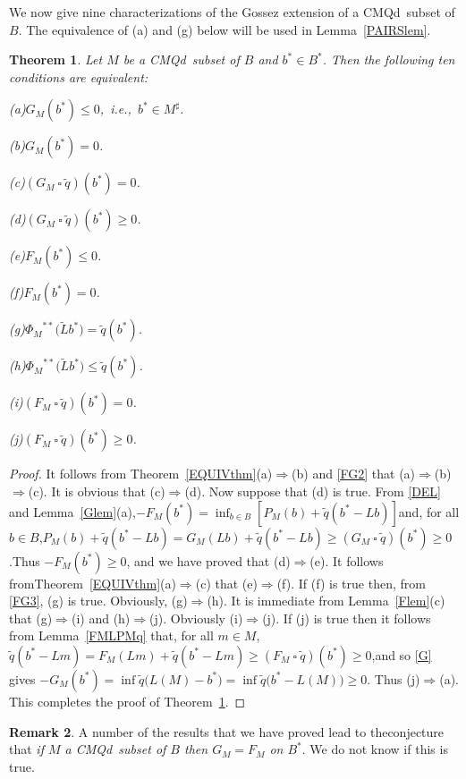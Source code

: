 \documentclass[letterpaper]{article}
\theoremstyle{plain}
\newtheorem{theorem}{Theorem}[section]
\theoremstyle{definition}
\newtheorem{remark}[theorem]{Remark}
\numberwithin{equation}{section}
\newcommand{\cmqd}{{CMQd}}
\newcommand{\dbs}{^{**}}
\newcommand{\infn}{\inf\nolimits}
\newcommand{\lr}{\Longrightarrow}
\newcommand{\Lt}{{\wt L}}
\newcommand{\qt}{\wt q}
\newcommand{\ssquare}{\ \square\ }
\newcommand{\wt}{\widetilde}
\newcommand{\Lem}{Lemma~\ref}
\newcommand{\Sec}{Section~\ref}
\newcommand{\Thm}{Theorem~\ref}
\begin{document}
%
We now give nine characterizations of the Gossez extension of a \cmqd\ subset of $B$.   The equivalence of (a) and (g) below will be used in \Lem{PAIRSlem}. 
\begin{theorem}\label{EQthm}
Let $M$ be a \cmqd\ subset of $B$ and $b^* \in B^*$.   Then the following ten conditions are equivalent:\par\noindent
{\rm(a)}\enspace $G_M(b^*) \le 0$,\hbox{\rm\ i.e.,  $b^* \in M^\sharp$.}\par\noindent
{\rm(b)}\enspace $G_M(b^*) = 0$.\par\noindent
{\rm(c)}\enspace $(G_M \ssquare\qt)(b^*) = 0$.\par\noindent
{\rm(d)}\enspace $(G_M \ssquare \qt)(b^*) \ge 0$.\par\noindent
{\rm(e)}\enspace $F_M(b^*) \le 0$.\par\noindent
{\rm(f)}\enspace $F_M(b^*) = 0$.\par\noindent
{\rm(g)}\enspace ${\Phi_M}\dbs\big(\Lt b^*\big) = \qt(b^*)$.\par\noindent
{\rm(h)}\enspace ${\Phi_M}\dbs\big(\Lt b^*\big) \le \qt(b^*)$.\par\noindent
{\rm(i)}\enspace $(F_M \ssquare \qt)(b^*) = 0$.\par\noindent
{\rm(j)}\enspace $(F_M \ssquare \qt)(b^*) \ge 0$.
\end{theorem}
%
\begin{proof}
It follows from \Thm{EQUIVthm}(a)$\lr$(b) and \eqref{FG2} that (a)$\lr$(b)$\lr$(c).    It is obvious that (c)$\lr$(d).  Now suppose that (d) is true.   From \eqref{DEL} and \Lem{Glem}(a),\quad $-F_M(b^*) = \infn_{b \in B}[P_M(b) + \qt(b^* - Lb)]$\quad and, for all $b \in B$,\quad $P_M(b) + \qt(b^* - Lb) = G_M(Lb) + \qt(b^* - Lb) \ge (G_M \ssquare \qt)(b^*) \ge 0$.\break Thus $-F_M(b^*) \ge 0$, and we have proved that (d)$\lr$(e).    It follows from\break \Thm{EQUIVthm}(a)$\lr$(c) that (e)$\lr$(f).   If (f) is true then, from \eqref{FG3}, (g) is true.   Obviously, (g)$\lr$(h).  It is immediate from \Lem{Flem}(c) that (g)$\lr$(i) and (h)$\lr$(j). Obviously (i)$\lr$(j).   If (j) is true then it follows from \Lem{FMLPMq} that, for all $m \in M$,\quad $\qt(b^* - Lm) = F_M(Lm) + \qt(b^* - Lm) \ge (F_M \ssquare \qt)(b^*) \ge 0$,\quad and so  \eqref{G} gives\quad    
$-G_M(b^*) = \inf\qt\big(L(M) - b^*\big) = \inf\qt\big(b^* - L(M)\big) \ge 0$.   Thus (j)$\lr$(a). This completes the proof of \Thm{EQthm}.
\end{proof}
%
\begin{remark}
A number of the results that we have proved lead to the\break conjecture that {\em if $M$ a \cmqd\ subset of $B$ then $G_M = F_M$ on $B^*$}. We do not know if this is true. 
\end{remark}
\end{document}

